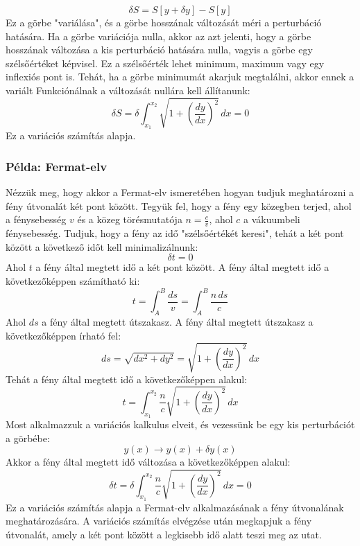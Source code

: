 \documentclass[a4paper,12pt]{article}
\begin{document}
\begin{equation}
    \delta S = S[y + \delta y] - S[y]
\end{equation}
Ez a görbe "variálása", és a görbe hosszának változását méri a perturbáció hatására. Ha a görbe variációja nulla, akkor az azt jelenti, hogy a görbe hosszának változása a kis perturbáció hatására nulla,
vagyis a görbe egy szélsőértéket képvisel. Ez a szélsőérték lehet minimum, maximum vagy egy inflexiós pont is. Tehát, ha a görbe minimumát akarjuk megtalálni, akkor ennek a variált Funkciónálnak a változását nullára kell állítanunk:
\begin{equation}
    \delta S = \delta \int_{x_1}^{x_2} \sqrt{1 + \left(\frac{dy}{dx}\right)^2} \, dx = 0
\end{equation}
Ez a variációs számítás alapja.

\subsubsection*{Példa: Fermat-elv}
Nézzük meg, hogy akkor a Fermat-elv ismeretében hogyan tudjuk meghatározni a fény útvonalát két pont között. Tegyük fel, hogy a fény egy közegben terjed, ahol a fénysebesség $v$ és a közeg törésmutatója $n = \frac{c}{v}$, ahol $c$ a vákuumbeli fénysebesség.
Tudjuk, hogy a fény az idő "szélsőértékét keresi", tehát a két pont között a következő időt kell minimalizálnunk:
\begin{equation}
    \delta t = 0
\end{equation}
Ahol $t$ a fény által megtett idő a két pont között. A fény által megtett idő a következőképpen számítható ki:
\begin{equation}
    t = \int_{A}^{B} \frac{ds}{v} = \int_{A}^{B} \frac{n \, ds}{c}
\end{equation}
Ahol $ds$ a fény által megtett útszakasz. A fény által megtett útszakasz a következőképpen írható fel:
\begin{equation}
    ds = \sqrt{dx^2 + dy^2} = \sqrt{1 + \left(\frac{dy}{dx}\right)^2} \, dx
\end{equation}
Tehát a fény által megtett idő a következőképpen alakul:
\begin{equation}
    t = \int_{x_1}^{x_2} \frac{n}{c} \sqrt{1 + \left(\frac{dy}{dx}\right)^2} \, dx
\end{equation}
Most alkalmazzuk a variációs kalkulus elveit, és vezessünk be egy kis perturbációt a görbébe:
\begin{equation}
    y(x) \to y(x) + \delta y(x)
\end{equation}
Akkor a fény által megtett idő változása a következőképpen alakul:
\begin{equation}
    \delta t = \delta \int_{x_1}^{x_2} \frac{n}{c} \sqrt{1 + \left(\frac{dy}{dx}\right)^2} \, dx = 0
\end{equation}
Ez a variációs számítás alapja a Fermat-elv alkalmazásának a fény útvonalának meghatározására. A variációs számítás elvégzése után megkapjuk a fény útvonalát, amely a két pont között a legkisebb idő alatt teszi meg az utat.
\end{document}
